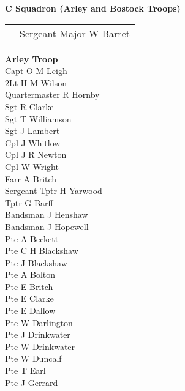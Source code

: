 \vspace*{10mm}
  
\begin{center}
  \Large
  \textbf{C Squadron (Arley and Bostock Troops)}
\end{center}

\vspace*{3mm}

\begin{center}
  \begin{tabular}{rl}
    & Sergeant Major W Barret \\
  \end{tabular}
\end{center}

\vspace*{3mm}

\begin{multicols}{3}
  \small
  \noindent
  \textbf{Arley Troop} \\
  Capt O M Leigh \\
  2Lt H M Wilson \\
  Quartermaster R Hornby \\
  Sgt R Clarke \\
  Sgt T Williamson \\
  Sgt J Lambert \\
  Cpl J Whitlow \\
  Cpl J R Newton \\
  Cpl W Wright \\
  Farr A Britch \\
  Sergeant Tptr H Yarwood \\
  Tptr G Barff \\
  Bandsman J Henshaw \\
  Bandsman J Hopewell \\
  Pte A Beckett \\
  Pte C H Blackshaw \\
  Pte J Blackshaw \\
  Pte A Bolton \\
  Pte E Britch \\
  Pte E Clarke \\
  Pte E Dallow \\
  Pte W Darlington \\
  Pte J Drinkwater \\
  Pte W Drinkwater \\
  Pte W Duncalf \\
  Pte T Earl \\
  Pte J Gerrard \\

\end{multicols}
